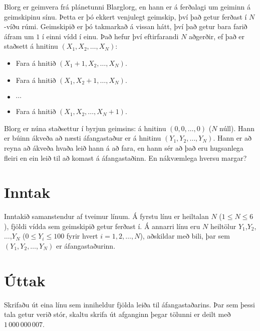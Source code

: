 
Blorg er geimvera frá plánetunni Blarglorg, en hann er á ferðalagi um geiminn á geimskipinu sínu. Þetta er þó ekkert venjulegt geimskip,
því það getur ferðast í $N$-víðu rúmi. Geimskipið er þó takmarkað á vissan hátt, því það getur bara farið áfram um $1$ í einni vídd í einu.
Það hefur því eftirfarandi $N$ aðgerðir, ef það er staðsett á hnitinu $(X_1,X_2,\ldots,X_N)$:

\begin{itemize}
    \item Fara á hnitið $(X_1+1,X_2,\ldots,X_N)$.
    \item Fara á hnitið $(X_1,X_2+1,\ldots,X_N)$.
    \item $\cdots$
    \item Fara á hnitið $(X_1,X_2,\ldots,X_N+1)$.
\end{itemize}

Blorg er núna staðsettur í byrjun geimsins: á hnitinu $(0,0,\ldots,0)$ ($N$ núll). Hann er búinn ákveða að næsti áfangastaður er á hnitinu $(Y_1,Y_2,\ldots,Y_N)$.
Hann er að reyna að ákveða hvaða leið hann á að fara, en hann sér að það eru hugsanlega fleiri en ein leið til að komast á áfangastaðinn. En nákvæmlega hversu margar?

\section*{Inntak}
Inntakið samanstendur af tveimur línum. Á fyrstu línu er heiltalan $N$
($1\leq N\leq 6$), fjöldi vídda sem geimskipið getur ferðast í. Á
annarri línu eru $N$ heiltölur
$Y_1$,$Y_2$,$\ldots$,$Y_N$ ($0\leq Y_i \leq 100$ fyrir hvert $i=1,2,\ldots,N$),
aðskildar með bili, þar sem
$(Y_1,Y_2,\ldots,Y_N)$ er
áfangastaðurinn.

\section*{Úttak}
Skrifaðu út eina línu sem inniheldur fjölda leiða til áfangastaðarins. Þar sem
þessi tala getur verið stór, skaltu skrifa út afganginn þegar tölunni er deilt
með $1\,000\,000\,007$.

